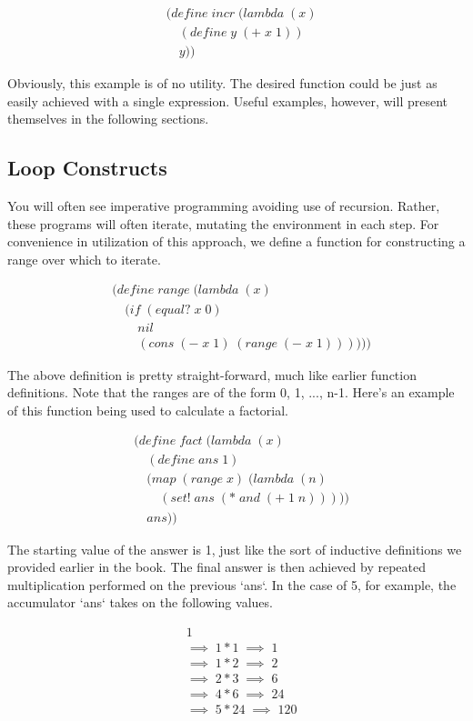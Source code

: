 \documentclass[11pt]{article}
\begin{document}
\begin{align*}
& (define \; incr \; (lambda \; (x)
\\& \quad (define \; y \; (+ \; x \; 1))
\\& \quad y))
\end{align*}

Obviously, this example is of no utility. The desired function could be just as easily achieved with a single expression. Useful examples, however, will present themselves in the following sections.

\subsection{Loop Constructs}
You will often see imperative programming avoiding use of recursion. Rather, these programs will often iterate, mutating the environment in each step. For convenience in utilization of this approach, we define a function for constructing a range over which to iterate.

\begin{align*}
& (define \; range \; (lambda \; (x)
\\& \quad (if \; (equal? \; x \; 0)
\\& \qquad nil
\\& \qquad (cons \; (- \; x \; 1) \; (range \; (- \; x \; 1))))))
\end{align*}

The above definition is pretty straight-forward, much like earlier function definitions. Note that the ranges are of the form 0, 1, ..., n-1. Here's an example of this function being used to calculate a factorial.

\begin{align*}
& (define \; fact \; (lambda \; (x)
\\& \quad (define \; ans \; 1)
\\& \quad (map \; (range \; x) \; (lambda \; (n)
\\& \qquad (set! \; ans \; (* \; and \; (+ \; 1 \; n)))))
\\& \quad ans))
\end{align*}

The starting value of the answer is 1, just like the sort of inductive definitions we provided earlier in the book. The final answer is then achieved by repeated multiplication performed on the previous `ans`. In the case of 5, for example, the accumulator `ans` takes on the following values.

\begin{align*}
& 1
\\& \implies \; 1*1 \; \implies \; 1
\\& \implies \; 1*2 \; \implies \; 2
\\& \implies \; 2*3 \; \implies \; 6
\\& \implies \; 4*6 \; \implies \; 24
\\& \implies \; 5*24 \; \implies \; 120
\end{align*}
\end{document}
